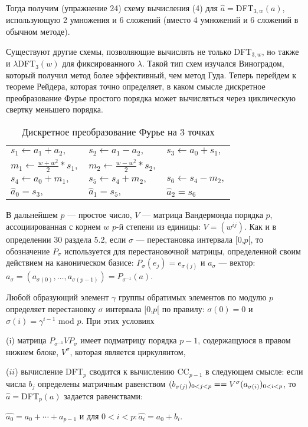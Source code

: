 \documentclass{mai_book}
\begin{document}
\par
Тогда получим (упражнение 24) схему вычисления (4) для $\hat{a} = $D{\footnotesize FT}$_{3,w}(a)$, использующую 2 умножения и 6 сложений (вместо 4 умножений и 6 сложений в обычном методе).\par 
Существуют другие схемы, позволяющие вычислять не только D{\footnotesize FT}$_{3,w}$, нo также и $\lambda$D{\footnotesize FT}$_3(w)$ для фиксированного $\lambda$. Такой тип схем изучался Виноградом, который получил метод более эффективный, чем метод Гуда. Теперь перейдем к теореме Рейдера, которая точно определяет, в каком смысле дискретное преобразование Фурье простого порядка может вычисляться через циклическую свертку меньшего порядка.\par
\begin{table}[h!]
  \begin{center}
\begin{tabular}{|lll|}
  \hline
  $s_1 \leftarrow a_1+a_2,$ & $s_2 \leftarrow a_1-a_2,$ & $s_3 \leftarrow a_0+s_1,$
  \\
  $m_1 \leftarrow \frac{w+w^2}{2} * s_1,$ & $m_2 \leftarrow \frac{w-w^2}{2} * s_2,$ & 
  \\
  $s_4 \leftarrow a_0+m_1,$ & $s_5 \leftarrow s_4+m_2,$ & $s_6 \leftarrow s_4-m_2,$
  \\
  $\hat{a}_0=s_3,$ & $\hat{a}_1=s_5,$ & $\hat{a}_2=s_6$
  \\
  \hline
\end{tabular}
\caption{Дискретное преобразование Фурье на 3 точках}
  \end{center}
\end{table}
\par
В дальнейшем $p$ --- простое число, $V$ --- матрица Вандермонда порядка $p$, ассоциированная с корнем $w$ $p$-й степени из единицы: $V = (w^{ij})$. Как и в определении 30 раздела 5.2, если $\sigma$ --- перестановка интервала [0,$p$[, то обозначение $P_{\sigma}$ используется для перестановочной матрицы, определенной своим действием на каноническом базисе: $P_{\sigma}(e_j)=e_{\sigma (j)}$ и $a_{\sigma}$ --- вектор: $a_{\sigma}=(a_{\sigma (0)},\dots,a_{\sigma (p-1)})=P_{\sigma^{-1}}(a)$.
\begin{thm}[Рейдер, 1968]
Любой образующий элемент $\gamma$ группы обратимых элементов по модулю $p$ определяет перестановку $\sigma$ интервала \textup{[}0,$p$\textup{[} по правилу: $\sigma (0)=0$ и $\sigma (i)= \gamma^{i-1}$ \textup{mod} $p$. При этих условиях\par
    (i) матрица $P_{\sigma^{-1}}VP_{\sigma}$ имеет подматрицу порядка $p-1$, содержащуюся в правом нижнем блоке, $V^{\sigma}$, которая является циркулянтом,\par
    ($ii$) вычисление D{\footnotesize FT}$_p$ сводится к вычислению C{\footnotesize C}$_{p-1}$ в следующем смысле: если числа $b_j$ определены матричным равенством $(b_{\sigma (j)})_{0 < j < p}=\linebreak=V^{\sigma}(a_{\sigma (i)})_{0 < i < p}$, то $\hat{a}=$D{\footnotesize FT}$_p(a)$ задается равенствами:\par
\begin{center}
  $\hat{a_0}=a_0 + \cdots + a_{p-1}$ и для $0 < i < p : \hat{a_i}=a_0 + b_i$.
\end{center}
\end{thm}
\end{document}
